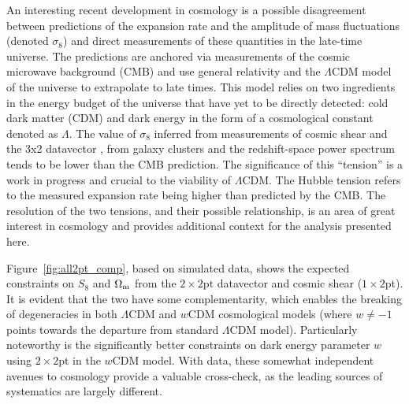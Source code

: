\documentclass[aps, prd,twocolumn,superscriptaddress,nofootinbib,preprintnumbers]{revtex4-1}
\begin{document}


An interesting recent development in cosmology is a possible disagreement between predictions of the expansion rate and the amplitude of mass fluctuations (denoted $\sigma_8$) and direct measurements of these quantities in the late-time universe. The predictions are anchored via measurements of the cosmic microwave background (CMB) and use general relativity and the $\Lambda$CDM model of the universe to extrapolate to late times. This model relies on two ingredients in the energy budget of the universe that have yet to be directly detected: cold dark matter (CDM) and dark energy in the form of a cosmological constant denoted as $\Lambda$. The value of $\sigma_8$ inferred from measurements of cosmic shear and the 3x2 datavector \citep{Abbott_2018,Troxel_2018, Heymans_2021, Hikage_2019, y3-3x2ptkp, y3-cosmicshear1, y3-cosmicshear2}, from galaxy clusters \citep{Abbott_2020_clusters,To_2021} and the redshift-space power spectrum \citep{Philcox_2020} tends to be lower than the CMB prediction. The significance of this ``tension''  is a work in progress and crucial to the viability of $\Lambda$CDM. The Hubble tension refers to the measured expansion rate being higher than predicted by the CMB. The resolution of the two tensions, and their possible relationship, is an area of great interest in cosmology and provides additional context for the analysis presented here. 

Figure~\ref{fig:all2pt_comp}, based on simulated data, shows the expected constraints on $S_8$ and $\Omega_{\rm m}$ from the $2\times2$pt datavector and cosmic shear ($1\times 2$pt). It is evident that the two have some complementarity, which enables the breaking of degeneracies in both $\Lambda$CDM and $w$CDM cosmological models (where $w \neq -1$ points towards the departure from standard $\Lambda$CDM model). Particularly noteworthy is the significantly better constraints on dark energy parameter $w$ using $2\times2$pt in the $w$CDM model. With data, these somewhat independent avenues to cosmology provide a valuable cross-check, as the leading sources of systematics are largely different. 
\end{document}
